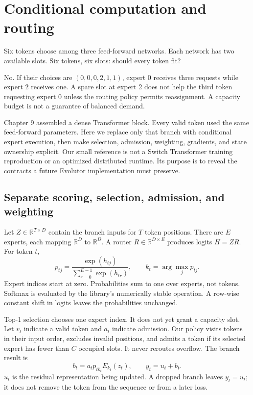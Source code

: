 \chapter{Conditional computation and routing}
\label{ch:routing}

Six tokens choose among three feed-forward networks. Each network has two available slots. Six tokens, six slots: should every token fit?

No. If their choices are $(0,0,0,2,1,1)$, expert 0 receives three requests while expert 2 receives one. A spare slot at expert 2 does not help the third token requesting expert 0 unless the routing policy permits reassignment. A capacity budget is not a guarantee of balanced demand.

Chapter 9 assembled a dense Transformer block. Every valid token used the same feed-forward parameters. Here we replace only that branch with conditional expert execution, then make selection, admission, weighting, gradients, and state ownership explicit. Our small reference is not a Switch Transformer training reproduction or an optimized distributed runtime. Its purpose is to reveal the contracts a future Evolutor implementation must preserve.

\section{Separate scoring, selection, admission, and weighting}
Let $Z\in\mathbb R^{T\times D}$ contain the branch inputs for $T$ token positions.
There are $E$ experts, each mapping $\mathbb R^D$ to $\mathbb R^D$. A router
$R\in\mathbb R^{D\times E}$ produces logits $H=ZR$. For token $t$,
\begin{equation}
p_{tj}=\frac{\exp(h_{tj})}{\sum_{r=0}^{E-1}\exp(h_{tr})},
\qquad k_t=\arg\max_j p_{tj}. \label{eq:route}
\end{equation}
Expert indices start at zero. Probabilities sum to one over experts, not tokens.
Softmax is evaluated by the library's numerically stable operation. A row-wise
constant shift in logits leaves the probabilities unchanged.

Top-1 selection chooses one expert index. It does not yet grant a capacity slot.
Let $v_t$ indicate a valid token and $a_t$ indicate admission. Our policy visits
tokens in their input order, excludes invalid positions, and admits a token if
its selected expert has fewer than $C$ occupied slots. It never reroutes overflow.
The branch result is
\begin{equation}
b_t=a_t p_{t k_t} E_{k_t}(z_t),\qquad y_t=u_t+b_t. \label{eq:branch}
\end{equation}
$u_t$ is the residual representation being updated. A dropped branch leaves
$y_t=u_t$; it does not remove the token from the sequence or from a later loss.


